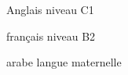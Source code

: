 

\begin{cvskills}

      \cvskill
    {Anglais} %
    {niveau C1} %

      \cvskill
    {français} %
    {niveau B2} %

      \cvskill
    {arabe} %
    { langue maternelle
    } %
\end{cvskills}

